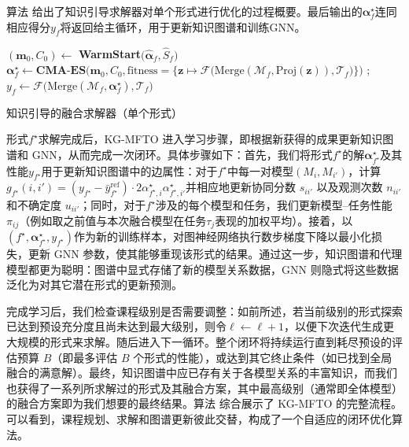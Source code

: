 \documentclass[../main.tex]{subfiles}
\begin{document}
算法 给出了知识引导求解器对单个形式进行优化的过程概要。最后输出的$\boldsymbol{\alpha}^\star_f$连同相应得分$y_f$将返回给主循环，用于更新知识图谱和训练GNN。

\begin{algorithm}[tb]
	\small
	\DontPrintSemicolon
	$(\mathbf{m}_0,C_0)\leftarrow$ \textbf{WarmStart}$\big(\hat{\boldsymbol{\alpha}}_f, \hat{S}_f\big)$
	$\displaystyle \boldsymbol{\alpha}^\star_f \leftarrow \textbf{CMA-ES}\Big(\mathbf{m}_0, C_0, \text{fitness}= \big\{\mathbf{z} \mapsto \mathcal{F}\big(\mathrm{Merge}(\mathcal{M}_f, \mathrm{Proj}(\mathbf{z})), \mathcal{T}_f\big)\big\}\Big)$ ;
	$y_f \leftarrow \mathcal{F}\Big(\mathrm{Merge}(\mathcal{M}_f, \boldsymbol{\alpha}^\star_f), \mathcal{T}_f\Big)$
	\caption{知识引导的融合求解器（单个形式）}
	\label{alg:solver}
\end{algorithm}

\label{sec:ch5-5-3-closed-loop-optimization-and-kg-update}
形式$f^\star$求解完成后，KG-MFTO 进入学习步骤，即根据新获得的成果更新知识图谱和 GNN，从而完成一次闭环。具体步骤如下：首先，我们将形式$f^\star$的解$\boldsymbol{\alpha}^\star_{f^\star}$及其性能$y_{f^\star}$用于更新知识图谱中的边属性：对于$f^\star$中每一对模型$(M_i,M_{i'})$，计算$g_{f^\star}(i,i')=(y_{f^\star}-\bar{y}^{\text{ref}}_{f^\star})\cdot 2\alpha^\star_{f^\star,i}\alpha^\star_{f^\star,i'}$并相应地更新协同分数 $s_{ii'}$ 以及观测次数 $n_{ii'}$ 和不确定度 $u_{ii'}$；同时，对于$f^\star$涉及的每个模型和任务，我们更新模型--任务性能$\pi_{ij}$（例如取之前值与本次融合模型在任务$\tau_j$表现的加权平均）。接着，以$(f^\star,\boldsymbol{\alpha}^\star_{f^\star},y_{f^\star})$作为新的训练样本，对图神经网络执行数步梯度下降以最小化损失，更新 GNN 参数，使其能够重现该形式的结果。通过这一步，知识图谱和代理模型都更为聪明：图谱中显式存储了新的模型关系数据，GNN 则隐式将这些数据泛化为对其它潜在形式的更新预测。

完成学习后，我们检查课程级别是否需要调整：如前所述，若当前级别的形式探索已达到预设充分度且尚未达到最大级别，则令$\ell \leftarrow \ell+1$，以便下次迭代生成更大规模的形式来求解。随后进入下一循环。整个闭环将持续运行直到耗尽预设的评估预算 $B$（即最多评估 $B$ 个形式的性能），或达到其它终止条件（如已找到全局融合的满意解）。最终，知识图谱中应已存有关于各模型关系的丰富知识，而我们也获得了一系列所求解过的形式及其融合方案，其中最高级别（通常即全体模型）的融合方案即为我们想要的最终结果。算法 综合展示了 KG-MFTO 的完整流程。可以看到，课程规划、求解和图谱更新彼此交替，构成了一个自适应的闭环优化算法。
\end{document}
